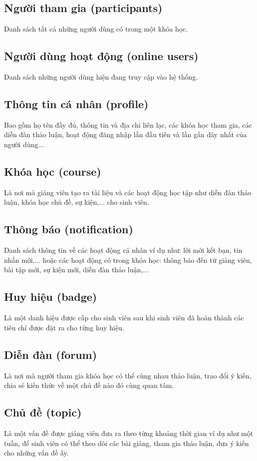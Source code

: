 \documentclass[./../main_file.tex]{subfiles}
\begin{document}
\subsection{Người tham gia (participants)}
Danh sách tất cả những người dùng có trong một khóa học.


\subsection{Người dùng hoạt động (online users)}
Danh sách những người dùng hiện đang truy cập vào hệ thống.

\subsection{Thông tin cá nhân (profile)}
Bao gồm họ tên đầy đủ, thông tin và địa chỉ liên lạc, các khóa học tham gia, các diễn đàn thảo luận, hoạt động đăng nhập lần đầu tiên và lần gần đây nhất của người dùng...

\subsection{Khóa học (course)}
Là nơi mà giảng viên tạo ra tài liệu và các hoạt động học tập như diễn đàn thảo luận, khóa học chủ đề, sự kiện,... cho sinh viên.

\subsection{Thông báo (notification)}
Danh sách thông tin về các hoạt động cá nhân ví dụ như: lời mời kết bạn, tin nhắn mới,... hoặc các hoạt động có trong khóa học: thông báo đến từ giảng viên, bài tập mới, sự kiện mới, diễn đàn thảo luận,...

\subsection{Huy hiệu (badge)}
Là một danh hiệu được cấp cho sinh viên sau khi sinh viên đã hoàn thành các tiêu chí được đặt ra cho từng huy hiệu.

\subsection{Diễn đàn (forum)}
Là nơi mà người tham gia khóa học có thể cùng nhau thảo luận, trao đổi ý kiến, chia sẻ kiến thức về một chủ đề nào đó cùng quan tâm.

\subsection{Chủ đề (topic)}
Là một vấn đề được giảng viên đưa ra theo từng khoảng thời gian ví dụ như một tuần, để sinh viên có thể theo dõi các bài giảng, tham gia thảo luận, đưa ý kiến cho những vấn đề ấy. 
\end{document}
